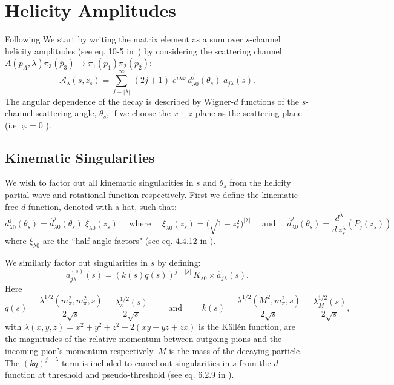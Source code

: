 \documentclass[10pt, aps,prd,amsmath,amssymb,superscriptaddress,onecolumn,
nofootinbib,showpacs,preprintnumbers]{revtex4-1}
\begin{document}
\section{Helicity Amplitudes} \label{sec:helicity}
Following \cite{Mikhasenko:2017rkh} We start by writing the matrix element as a sum over \(s\)-channel helicity amplitudes (see eq. 10-5 in~\cite{perl}) by considering the scattering channel \(A(p_A, \lambda) \pi_3(\overline{p}_3) \to  \pi_1(p_1)\pi_2(p_2)\):
  \begin{equation}
    \label{eq:helicity}
    \mathcal{A}_\lambda(s,z_s) = \sum_{j= |\lambda|}^\infty \, (2j +1) \; e^{i\lambda\varphi} \, d_{\lambda0}^j(\theta_s) \; a_{j \lambda}(s).
  \end{equation}
The angular dependence of the decay is described by Wigner-\(d\) functions of the \(s\)-channel scattering angle, \(\theta_s\), if we choose the \(x-z\) plane as the scattering plane (i.e. \(\varphi = 0 \) ).
\subsection{Kinematic Singularities}
\label{sec:kin-singularities}
We wish to factor out all kinematic singularities in \(s\) and \(\theta_s\) from the helicity partial wave and rotational function respectively. First we define the kinematic-free \(d\)-function, denoted with a hat, such that:
  \begin{equation}
      \label{eq:halfangle}
      d^j_{\lambda 0}(\theta_s) = \hat{d}^j_{\lambda 0}(\theta_s) \; \xi_{\lambda 0}(z_s)
       \quad \text{ where } \quad
      \xi_{\lambda 0}(z_s) = \bigg( \sqrt{ 1- z_s^2} \bigg)^{|\lambda|}
       \quad \text{ and } \quad
      \hat{d}^j_{\lambda 0}(\theta_s) = \frac{d^\lambda}{d \, z_s^\lambda} (P_j(z_s))
  \end{equation}
where \(\xi_{\lambda 0}\) are the ``half-angle factors" (see eq. 4.4.12 in \cite{Collins}).

We similarly factor out singularities in \(s\) by defining:
  \begin{equation}
    \label{eq:kinematicfreepartialwave}
    a^{(s)}_{j\lambda}(s) = (k(s)q(s))^{j - |\lambda|} \, K_{\lambda 0} \times \hat{a}_{j\lambda}(s).
  \end{equation}
Here
  \begin{equation}
    \label{eq:momenta}
    q(s) = \frac{\lambda^{1/2}(m_\pi^2, m_\pi^2, s)}{2\sqrt{s}} = \frac{\lambda_\pi^{1/2}(s)}{2\sqrt{s}}
     \qquad \text{ and } \qquad
     k(s) = \frac{\lambda^{1/2}(M^2, m_\pi^2, s)}{2\sqrt{s}} = \frac{\lambda_M^{1/2}(s)}{2\sqrt{s}} ,
  \end{equation}
with \(\lambda(x,y,z) = x^2 + y^2 + z^2 - 2 (xy + yz + zx)\) is the K\"{a}ll\'{e}n function, are the magnitudes of  the relative momentum between outgoing pions and the incoming pion's momentum respectively. \(M\) is the mass of the decaying particle. The \((kq)^{j-\lambda}\) term is included to cancel out singularities in \(s\) from the \(d\)-function at threshold and pseudo-threshold (see eq. 6.2.9 in \cite{Collins}).
\end{document}
